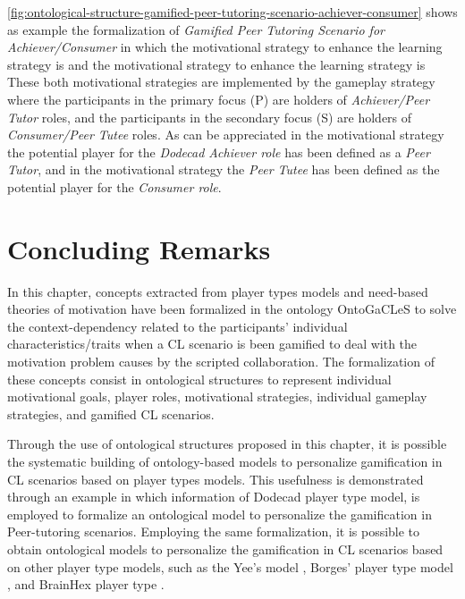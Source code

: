 \autoref{fig:ontological-structure-gamified-peer-tutoring-scenario-achiever-consumer} shows as example the formalization of \emph{Gamified Peer Tutoring Scenario for Achiever/Consumer} in which the motivational strategy to enhance the learning strategy  is  and the motivational strategy to enhance the learning strategy  is  These both motivational strategies are implemented by the gameplay strategy  where the participants in the primary focus (P) are holders of \emph{Achiever/Peer Tutor} roles, and the participants in the secondary focus (S) are holders of \emph{Consumer/Peer Tutee} roles. As can be appreciated in the motivational strategy  the potential player for the \emph{Dodecad Achiever role} has been defined as a \emph{Peer Tutor}, and in the motivational strategy  the \emph{Peer Tutee} has been defined as the potential player for the \emph{Consumer role}. 



\section{Concluding Remarks}
\label{sec:ontogacles1-concluding-remarks}

In this chapter, concepts extracted from player types models and need-based theories of motivation have been formalized in the ontology OntoGaCLeS to solve the context-dependency related to the participants' individual characteristics/traits when a CL scenario is been gamified to deal with the motivation problem causes by the scripted collaboration. The formalization of these concepts consist in ontological structures to represent individual motivational goals, player roles, motivational strategies, individual gameplay strategies, and gamified CL scenarios.

Through the use of ontological structures proposed in this chapter, it is possible the systematic building of ontology-based models to personalize gamification in CL scenarios based on player types models. This usefulness is demonstrated through an example in which information of Dodecad player type model, is employed to formalize an ontological model to personalize the gamification in Peer-tutoring scenarios. Employing the same formalization, it is possible to obtain ontological models to personalize the gamification in CL scenarios based on other player type models, such as the Yee's model \cite{Yee2006}, Borges' player type model \cite{BorgesMizoguchiDurelliBittencourtIsotani2016}, and BrainHex player type \cite{NackeBatemanMandryk2014}.

